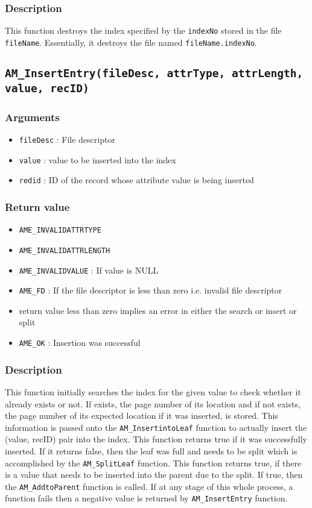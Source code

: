 \documentclass[a4paper, 12pt]{article}
\begin{document}
\subsubsection{Description}
This function destroys the index specified by the \texttt{indexNo} stored in the file \texttt{fileName}. Essentially, it destroys the file named \texttt{fileName.indexNo}.

\subsection{\texttt{AM\_InsertEntry(fileDesc, attrType, attrLength, value, recID)}}
\subsubsection{Arguments}
\begin{itemize}
	\item{\texttt{fileDesc} : File descriptor}
	\item{\texttt{value} : value to be inserted into the index}
	\item{\texttt{redid} : ID of the record whose attribute value is being inserted}
\end{itemize}
\subsubsection{Return value}
\begin{itemize}
	\item{\texttt{AME\_INVALIDATTRTYPE}}
	\item{\texttt{AME\_INVALIDATTRLENGTH}}
	\item{\texttt{AME\_INVALIDVALUE} : If value is NULL}
	\item{\texttt{AME\_FD} : If the file descriptor is less than zero i.e. invalid file descriptor}
	\item{return value less than zero implies an error in either the search or insert or split}
	\item{\texttt{AME\_OK} : Insertion was successful}
\end{itemize}
\subsubsection{Description}
This function initially searches the index for the given value to check whether it already exists or not. If exists, the page number of its location and if not exists, the page number of its expected location if it was inserted, is stored. This information is passed onto the \texttt{AM\_InsertintoLeaf} function to actually insert the (value, recID) pair into the index. This function returns true if it was successfully inserted. If it returns false, then the leaf was full and needs to be split which is accomplished by the \texttt{AM\_SplitLeaf} function. This function returns true, if there is a value that needs to be inserted into the parent due to the split. If true, then the \texttt{AM\_AddtoParent} function is called. If at any stage of this whole process, a function fails then a negative value is returned by \texttt{AM\_InsertEntry} function.
\end{document}
